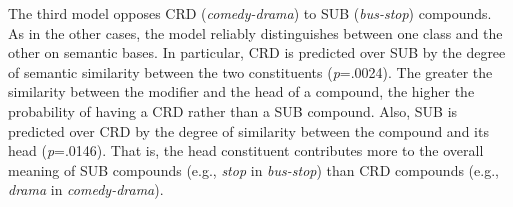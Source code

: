 \documentclass[output=paper]{langsci/langscibook}
\begin{document}
\begin{table}[b]
\caption{Results of the logit model opposing CRD (1) to SUB (0).\label{tab:reascrdsub}
}
\end{table}

The third model opposes CRD (\emph{comedy-drama}) to SUB (\emph{bus-stop}) compounds. As in the other cases, the model reliably distinguishes between one class and the other on semantic bases. In particular, CRD is predicted over SUB by the degree of semantic similarity between the two constituents (\emph{p}=.0024). The greater the similarity between the modifier and the head of a compound, the higher the probability of having a CRD rather than a SUB compound. Also, SUB is predicted over CRD by the degree of similarity between the compound and its head (\emph{p}=.0146). That is, the head constituent contributes more to the overall meaning of SUB compounds (e.g., \emph{stop} in \emph{bus-stop}) than CRD compounds (e.g., \emph{drama} in \emph{comedy-drama}).
\end{document}
